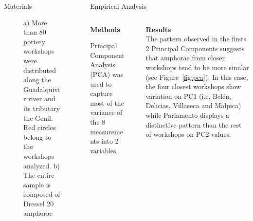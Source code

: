 \documentclass[final]{beamer}
\newlength{\sepwid}
\newlength{\onecolwid}
\newlength{\twocolwid}
\begin{document}
\begin{frame}[t]
\begin{columns}[t]
\begin{column}{\onecolwid}
\begin{block}{Materials}
\begin{figure}
\singlespace
\caption{a) More than 80 pottery workshops were distributed along the Guadalquivir river and its tributary the Genil. Red circles belong to the workshops analyzed. b) The entire sample is composed of Dressel 20 amphorae}
\label{fig:betica}
\end{figure}


 \end{block}
\end{column} %

\begin{column}{\twocolwid}


\begin{block}{Empirical Analysis}

\begin{columns}[t,totalwidth=\twocolwid]
\begin{column}{\onecolwid} %


{\textbf{Methods}} 
\justify

Principal Component Analysis (PCA) was used to capture most of the variance of the 8 measurements into 2 variables. 


\end{column}

\begin{column}{\sepwid}\end{column} %

\begin{column}{\onecolwid} %

{\textbf{Results}}\\
\justify
The pattern observed in the firsts 2 Principal Components suggests that amphorae from closer workshops tend to be more similar (see Figure~\ref{fig:pca}). In this case, the four closest workshops show variation on PC1 (i.e. Bel\'en, Delicias, Villaseca and Malpica) while Parlamento displays a distinctive pattern than the rest of workshops on PC2 values.


\end{column}
\end{columns}

\begin{columns}[t,totalwidth=\twocolwid]



\end{columns}
\end{block}
\end{column}
\end{columns}
\end{frame}
\end{document}
